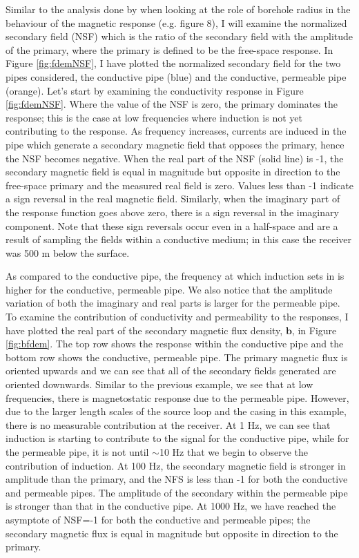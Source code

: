 Similar to the analysis done by \cite{Augustin1989} when looking at the role of borehole radius in the behaviour of the magnetic response (e.g. figure 8), I will examine the normalized secondary field (NSF) which is the ratio of the secondary field with the amplitude of the primary, where the primary is defined to be the free-space response. In Figure \ref{fig:fdemNSF}, I have plotted the normalized secondary field for the two pipes considered, the conductive pipe (blue) and the conductive, permeable pipe (orange). Let's start by examining the conductivity response in Figure \ref{fig:fdemNSF}. Where the value of the NSF is zero, the primary dominates the response; this is the case at low frequencies where induction is not yet contributing to the response. As frequency increases, currents are induced in the pipe which generate a secondary magnetic field that opposes the primary, hence the NSF becomes negative. When the real part of the NSF (solid line) is -1, the secondary magnetic field is equal in magnitude but opposite in direction to the free-space primary and the measured real field is zero. Values less than -1 indicate a sign reversal in the real magnetic field. Similarly, when the imaginary part of the response function goes above zero, there is a sign reversal in the imaginary component. Note that these sign reversals occur even in a half-space and are a result of sampling the fields within a conductive medium; in this case the receiver was 500 m below the surface.

As compared to the conductive pipe, the frequency at which induction sets in is higher for the conductive, permeable pipe. We also notice that the amplitude variation of both the imaginary and real parts is larger for the permeable pipe. To examine the contribution of conductivity and permeability to the responses, I have plotted the real part of the secondary magnetic flux density, $\mathbf{b}$, in Figure \ref{fig:bfdem}. The top row shows the response within the conductive pipe and the bottom row shows the conductive, permeable pipe. The primary magnetic flux is oriented upwards and we can see that all of the secondary fields generated are oriented downwards. Similar to the previous example, we see that at low frequencies, there is magnetostatic response due to the permeable pipe. However, due to the larger length scales of the source loop and the casing in this example, there is no measurable contribution at the receiver. At 1 Hz, we can see that induction is starting to contribute to the signal for the conductive pipe, while for the permeable pipe, it is not until $\sim$10 Hz that we begin to observe the contribution of induction. At 100 Hz, the secondary magnetic field is stronger in amplitude than the primary, and the NFS is less than -1 for both the conductive and permeable pipes. The amplitude of the secondary within the permeable pipe is stronger than that in the conductive pipe. At 1000 Hz, we have reached the asymptote of NSF=-1 for both the conductive and permeable pipes; the secondary magnetic flux is equal in magnitude but opposite in direction to the primary.

